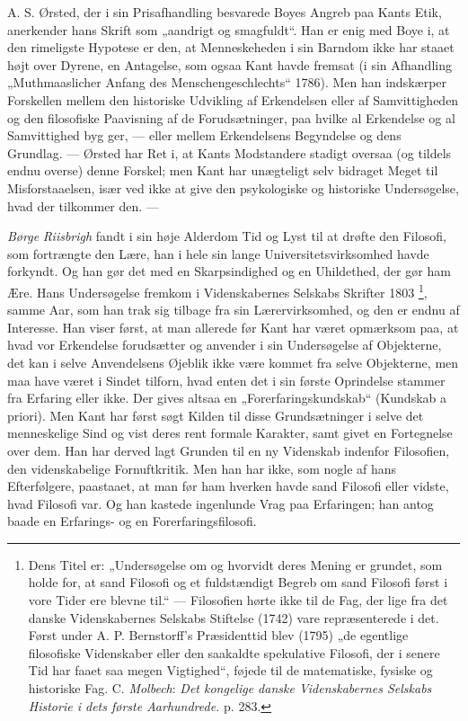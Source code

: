 \documentclass[12pt,a4paper,openany]{book}
\newcommand{\opage}[1]{\marginnote{\footnotesize\textit{[#1]}}}
\begin{document}
A. S. Ørsted, der i sin Prisafhandling besvarede Boyes Angreb paa Kants Etik,
anerkender hans Skrift som „aandrigt og smagfuldt“. Han er enig med Boye i, at
den rimeligste Hypotese er den, at Menneskeheden i sin Barndom ikke har staaet
højt over Dyrene, en Antagelse, som ogsaa Kant havde fremsat (i sin Afhandling
„Muthmaaslicher Anfang des Menschengeschlechts“ 1786). Men han indskærper
Forskellen mellem den historiske Udvikling af Erkendelsen eller af
Samvittigheden og den filosofiske Paavisning af de Forudsætninger, paa hvilke
al Erkendelse og al Samvittighed byg%
\setcounter{footnote}{0}%
\opage{35}ger, --- eller mellem Erkendelsens Begyndelse og dens Grundlag. ---
Ørsted har Ret i, at Kants Modstandere stadigt oversaa (og tildels endnu
overse) denne Forskel; men Kant har unægteligt selv bidraget Meget til
Misforstaaelsen, især ved ikke at give den psykologiske og historiske
Undersøgelse, hvad der tilkommer den. ---

\emph{Børge} \emph{Riisbrigh} fandt i sin høje Alderdom Tid og Lyst til at
drøfte den Filosofi, som fortrængte den Lære, han i hele sin lange
Universitetsvirksomhed havde forkyndt. Og han gør det med en Skarpsindighed og
en Uhildethed, der gør ham Ære. Hans Undersøgelse fremkom i Videnskabernes
Selskabs Skrifter 1803%
\footnote[1]{Dens Titel er: „Undersøgelse om og hvorvidt deres Mening er
grundet, som holde for, at sand Filosofi og et fuldstændigt Begreb om sand
Filosofi først i vore Tider ere blevne til.“ --- Filosofien hørte ikke til de
Fag, der lige fra det danske Videnskabernes Selskabs Stiftelse (1742) vare
repræsenterede i det. Først under A. P. Bernstorff's Præsidenttid blev (1795)
„de egentlige filosofiske Videnskaber eller den saakaldte spekulative Filosofi,
der i senere Tid har faaet saa megen Vigtighed“, føjede til de matematiske,
fysiske og historiske Fag. C. \emph{Molbech}: \textit{Det kongelige danske
Videnskabernes Selskabs Historie i dets første Aarhundrede.} p. 283.}, samme
Aar, som han trak sig tilbage fra sin Lærervirksomhed, og den er endnu af
Interesse. Han viser først, at man allerede før Kant har været opmærksom paa,
at hvad vor Erkendelse forudsætter og anvender i sin Undersøgelse af
Objekterne, det kan i selve Anvendelsens Øjeblik ikke være kommet fra selve
Objekterne, men maa have været i Sindet tilforn, hvad enten det i sin første
Oprindelse stammer fra Erfaring eller ikke. Der gives altsaa en
„Forerfaringskundskab“ (Kundskab a priori). Men Kant har først søgt Kilden til
disse Grundsætninger i selve det menneskelige Sind og vist deres rent formale
Karakter, samt givet en Fortegnelse over dem. Han har derved lagt Grunden til
en ny Videnskab indenfor Filosofien, den videnskabelige Fornuftkritik. Men han
har ikke, som nogle af hans Efterfølgere, paastaaet, at man før ham hverken
havde sand Filosofi eller vidste, hvad Filosofi var. Og han kastede
\setcounter{footnote}{0}%
\opage{36}ingenlunde Vrag paa Erfaringen; han antog baade en Erfarings- og en
Forerfaringsfilosofi.
\end{document}

